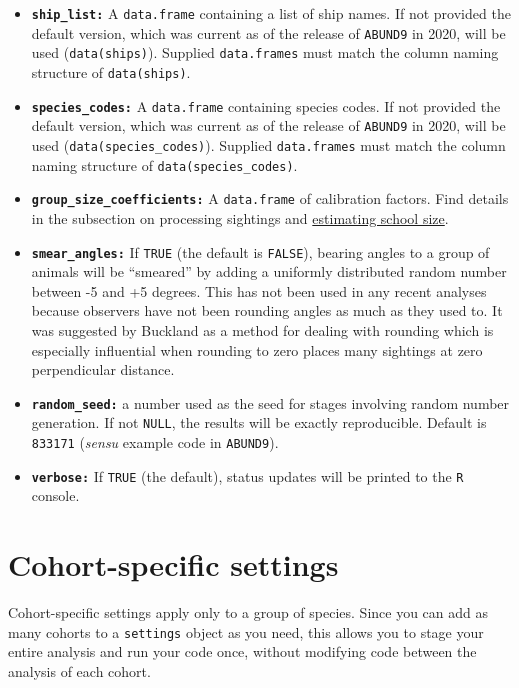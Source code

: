 \documentclass[
]{book}
\begin{document}
\begin{itemize}
\item
  \textbf{\texttt{ship\_list:}} A \texttt{data.frame} containing a list of ship names. If not provided the default version, which was current as of the release of \texttt{ABUND9} in 2020, will be used (\texttt{data(ships)}). Supplied \texttt{data.frames} must match the column naming structure of \texttt{data(ships)}.
\item
  \textbf{\texttt{species\_codes:}} A \texttt{data.frame} containing species codes. If not provided the default version, which was current as of the release of \texttt{ABUND9} in 2020, will be used (\texttt{data(species\_codes)}). Supplied \texttt{data.frames} must match the column naming structure of \texttt{data(species\_codes)}.
\item
  \textbf{\texttt{group\_size\_coefficients:}} A \texttt{data.frame} of calibration factors. Find details in the subsection on processing sightings and \protect\hyperlink{ss_calibration}{estimating school size}.
\item
  \textbf{\texttt{smear\_angles:}} If \texttt{TRUE} (the default is \texttt{FALSE}), bearing angles to a group of animals will be ``smeared'' by adding a uniformly distributed random number between -5 and +5 degrees. This has not been used in any recent analyses because observers have not been rounding angles as much as they used to. It was suggested by Buckland as a method for dealing with rounding which is especially influential when rounding to zero places many sightings at zero perpendicular distance.
\item
  \textbf{\texttt{random\_seed:}} a number used as the seed for stages involving random number generation. If not \texttt{NULL}, the results will be exactly reproducible. Default is \texttt{833171} (\emph{sensu} example code in \texttt{ABUND9}).
\item
  \textbf{\texttt{verbose:}} If \texttt{TRUE} (the default), status updates will be printed to the \texttt{R} console.
\end{itemize}

\hypertarget{cohort-specific-settings}{%
\section*{Cohort-specific settings}\label{cohort-specific-settings}}

Cohort-specific settings apply only to a group of species. Since you can add as many cohorts to a \texttt{settings} object as you need, this allows you to stage your entire analysis and run your code once, without modifying code between the analysis of each cohort.
\end{document}

